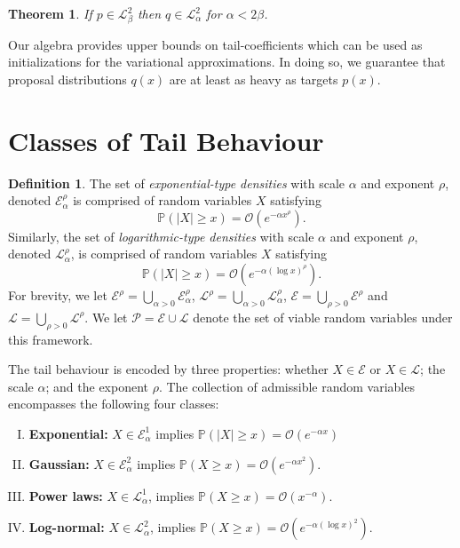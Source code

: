 \documentclass{article}
\newtheorem{theorem}{Theorem}
\theoremstyle{definition}
\newtheorem{definition}{Definition}
\begin{document}
\begin{theorem}\label{thm:bdd-importance-ratio}
    If $p \in \mathcal{L}_\beta^2$ then $q \in \mathcal{L}_\alpha^2$ for $\alpha < 2 \beta$.
\end{theorem}


Our algebra provides upper bounds on tail-coefficients which can be used as initializations
for the variational approximations. In doing so, we guarantee that proposal distributions $q(x)$ are at least as heavy as targets $p(x)$.

\section{Classes of Tail Behaviour}

\begin{definition}
The set of \emph{exponential-type densities} with scale $\alpha$ and exponent $\rho$, denoted $\mathcal{E}_\alpha^\rho$ is comprised of random variables $X$ satisfying
\[
\mathbb{P}(|X| \geq x) = \mathcal{O}(e^{-\alpha x^\rho}).
\]
Similarly, the set of \emph{logarithmic-type densities} with scale $\alpha$ and exponent $\rho$, denoted $\mathcal{L}_\alpha^\rho$, is comprised of random variables $X$ satisfying
\[
\mathbb{P}(|X| \geq x) = \mathcal{O}(e^{-\alpha (\log x)^\rho}).
\]
For brevity, we let $\mathcal{E}^\rho = \bigcup_{\alpha > 0} \mathcal{E}_\alpha^\rho$, $\mathcal{L}^\rho = \bigcup_{\alpha > 0} \mathcal{L}_\alpha^\rho$,  $\mathcal{E}=\bigcup_{\rho>0} \mathcal{E}^\rho$ and $\mathcal{L}=\bigcup_{\rho>0} \mathcal{L}^\rho$. We let $\mathcal{P} = \mathcal{E} \cup \mathcal{L}$ denote the set of viable random variables under this framework. 
\end{definition}

The tail behaviour is encoded by three properties: whether $X \in \mathcal{E}$ or $X \in \mathcal{L}$; the scale $\alpha$; and the exponent $\rho$. The collection of admissible random variables encompasses the following four classes:
\begin{enumerate}[(I)]
\item \textbf{Exponential:} $X \in \mathcal{E}_\alpha^1$ implies $\mathbb{P}(|X| \geq x) = \mathcal{O}(e^{-\alpha x})$
\item \textbf{Gaussian:}  $X\in\mathcal{E}_{\alpha}^{2}$ implies $\mathbb{P}(X\geq x)=\mathcal{O}(e^{-\alpha x^{2}})$.
\item \textbf{Power laws:} $X\in\mathcal{L}_{\alpha}^{1}$, implies $\mathbb{P}(X\geq x)=\mathcal{O}(x^{-\alpha})$.
\item \textbf{Log-normal:} $X\in\mathcal{L}_{\alpha}^{2}$, implies $\mathbb{P}(X\geq x)=\mathcal{O}(e^{-\alpha(\log x)^{2}})$.
\end{enumerate}
\end{document}
